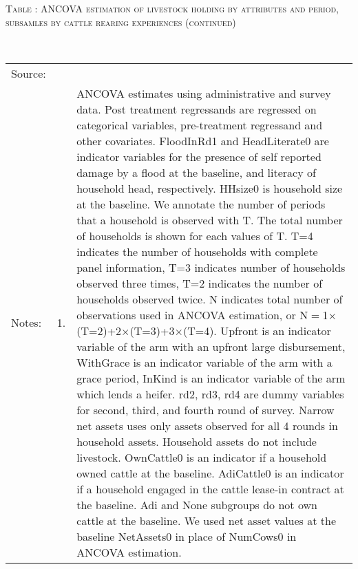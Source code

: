 \addtocounter{table}{-1}
\hspace{-1cm}\begin{minipage}[t]{14cm}
\hfil\textsc{\normalsize Table \thetable: ANCOVA estimation of livestock holding by attributes and period, subsamles by cattle rearing experiences (continued)\label{tab ANCOVA livestock holding Experience timevarying attributes 2}}\\
\setlength{\tabcolsep}{1pt}
\setlength{\baselineskip}{8pt}
\renewcommand{\arraystretch}{.52}
\hfil{}\\
\renewcommand{\arraystretch}{.8}
\setlength{\tabcolsep}{1pt}
\begin{tabular}{>{\hfill\scriptsize}p{1cm}<{}>{\hfill\scriptsize}p{.25cm}<{}>{\scriptsize}p{12cm}<{\hfill}}
Source:& \multicolumn{2}{l}{\scriptsize Estimated with GUK administrative and survey data.}\\
Notes: & 1. & ANCOVA estimates using administrative and survey data. Post treatment regressands are regressed on categorical variables, pre-treatment regressand and other covariates. \textsf{FloodInRd1} and \textsf{HeadLiterate0} are indicator variables for the presence of self reported damage by a flood at the baseline, and literacy of household head, respectively. \textsf{HHsize0} is household size at the baseline. We annotate the number of periods that a household is observed with \textsf{T}. The total number of households is shown for each values of \textsf{T}. \textsf{T=4} indicates the number of households with complete panel information, \textsf{T=3} indicates number of households observed three times, \textsf{T=2} indicates the number of households observed twice. \textsf{N} indicates total number of observations used in ANCOVA estimation, or \textsf{N$=$1$\times$(T=2)+2$\times$(T=3)+3$\times$(T=4)}.  \textsf{Upfront} is an indicator variable of the arm with an upfront large disbursement, \textsf{WithGrace} is an indicator variable of the arm with a grace period, \textsf{InKind} is an indicator variable of the arm which lends a heifer. \textsf{rd2, rd3, rd4} are dummy variables for second, third, and fourth round of survey. Narrow net assets uses only assets observed for all 4 rounds in household assets. Household assets do not include livestock. \textsf{OwnCattle0} is an indicator if a household owned cattle at the baseline. \textsf{AdiCattle0} is an indicator if a household engaged in the cattle lease-in contract at the baseline.  \textsf{Adi} and \textsf{None} subgroups do not own cattle at the baseline. We used net asset values at the baseline \textsf{NetAssets0} in place of \textsf{NumCows0} in ANCOVA estimation.\\

\end{tabular}
\end{minipage}
